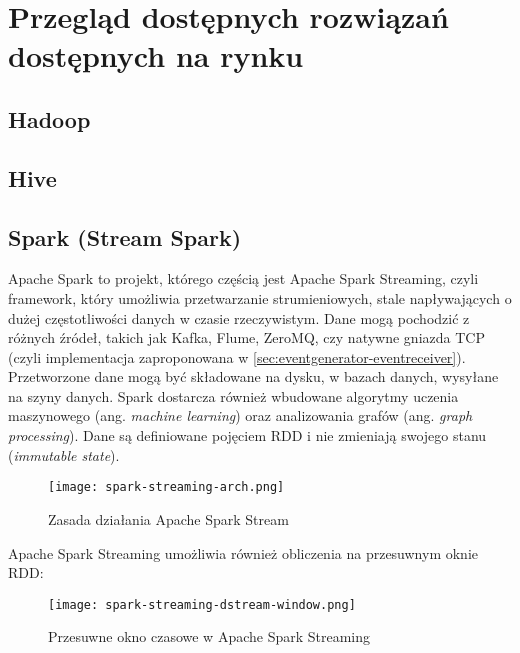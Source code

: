 \section{Przegląd dostępnych rozwiązań dostępnych na rynku}
\label{sec:solutions}



\subsection{Hadoop}
\label{sec:solutions:hadoop}



\subsection{Hive}
\label{sec:solutions:hive}



\subsection{Spark (Stream Spark)}
\label{sec:solutions:spark}

Apache Spark to projekt, którego częścią jest Apache Spark Streaming, czyli framework, który umożliwia przetwarzanie strumieniowych, stale napływających o dużej częstotliwości danych w czasie rzeczywistym. Dane mogą pochodzić z różnych źródeł, takich jak Kafka, Flume, ZeroMQ, czy natywne gniazda TCP (czyli implementacja zaproponowana w \ref{sec:eventgenerator-eventreceiver}). Przetworzone dane mogą być składowane na dysku, w bazach danych, wysyłane na szyny danych. Spark dostarcza również wbudowane algorytmy uczenia maszynowego (ang. \emph{machine learning}) oraz analizowania grafów (ang. \emph{graph processing}). Dane są definiowane pojęciem RDD\cite{manual-apache-spark-streaming} i nie zmieniają swojego stanu (\emph{immutable state}).

\begin{figure}[h!]
  \centering
    \texttt{[image: spark-streaming-arch.png]}
  \caption{Zasada działania Apache Spark Stream}
  \label{fig:spark-streaming-arch}
\end{figure}

Apache Spark Streaming umożliwia również obliczenia na przesuwnym oknie RDD:

\begin{figure}[h!]
  \centering
    \texttt{[image: spark-streaming-dstream-window.png]}
  \caption{Przesuwne okno czasowe w Apache Spark Streaming}
  \label{fig:spark-streaming-dstream-window}
\end{figure}

